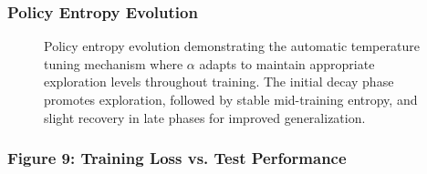 \documentclass[10pt,a4paper,twocolumn]{article}
\begin{document}
\subsubsection*{Policy Entropy Evolution}

\begin{figure}[h]
    \centering
    \caption{Policy entropy evolution demonstrating the automatic temperature tuning mechanism where $\alpha$ adapts to maintain appropriate exploration levels throughout training. The initial decay phase promotes exploration, followed by stable mid-training entropy, and slight recovery in late phases for improved generalization.}
    \label{fig:entropy_evolution}
\end{figure}

\subsubsection*{Figure 9: Training Loss vs. Test Performance}
\end{document}
